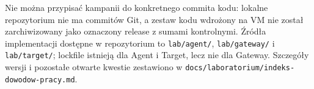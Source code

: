 Nie można przypisać kampanii do konkretnego commita kodu: lokalne repozytorium
nie ma commitów Git, a zestaw kodu wdrożony na VM nie został zarchiwizowany
jako oznaczony release z sumami kontrolnymi. Źródła implementacji dostępne
w repozytorium to \texttt{lab/agent/}, \texttt{lab/gateway/} i
\texttt{lab/target/}; lockfile istnieją dla Agent i Target, lecz nie dla
Gateway. Szczegóły wersji i pozostałe otwarte kwestie zestawiono w
\texttt{docs/laboratorium/indeks-dowodow-pracy.md}.

